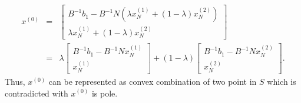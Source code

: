 \documentclass[paper=a4, fontsize=11pt]{scrartcl} %
\numberwithin{equation}{section} %
\numberwithin{figure}{section} %
\numberwithin{table}{section} %
\begin{document}
\begin{itemize}
\begin{equation}
\begin{array}{rcl}
x^{(0)}&=&\begin{bmatrix} B^{-1}b_1-B^{-1}N(\lambda x^{(1)}_N+(1-\lambda)x^{(2)}_N) \\ \lambda x^{(1)}_N+(1-\lambda)x^{(2)}_N \end{bmatrix}\\
&=&\lambda\begin{bmatrix} B^{-1}b_1-B^{-1}Nx^{(1)}_N \\ x^{(1)}_N \end{bmatrix}+(1-\lambda)\begin{bmatrix} B^{-1}b_1-B^{-1}Nx^{(2)}_N \\ x^{(2)}_N \end{bmatrix}.
\end{array}
\end{equation}
Thus, $x^{(0)}$ can be represented as convex combination of two point in $S$ which is contradicted with $x^{(0)}$ is pole.


\end{itemize}
\end{document}
